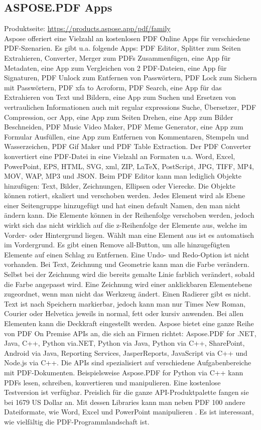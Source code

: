 \subsection{ASPOSE.PDF Apps}
Produktseite: \url{https://products.aspose.app/pdf/family} \\
Aspose offeriert eine Vielzahl an kostenlosen PDF Online Apps für verschiedene PDF-Szenarien. Es gibt u.a. folgende Apps: PDF Editor, Splitter zum Seiten Extrahieren, Converter, Merger zum PDFs Zusammenfügen, eine App für Metadaten, eine App zum Vergleichen von 2 PDF-Dateien, eine App für Signaturen, PDF Unlock zum Entfernen von Passwörtern, PDF Lock zum Sichern mit Passwörtern, PDF \gls{xfa} to Acroform, PDF Search, eine App für das Extrahieren von Text und Bildern, eine App zum Suchen und Ersetzen von vertraulichen Informationen auch mit regular expressions Suche, Übersetzer, PDF Compression, \gls{ocr} App, eine App zum Seiten Drehen, eine App zum Bilder Beschneiden, PDF Music Video Maker, PDF Meme Generator, eine App zum Formular Ausfüllen, eine App zum Entfernen von Kommentaren, Stempeln und Wasserzeichen, PDF Gif Maker und PDF Table Extraction. Der PDF Converter konvertiert eine PDF-Datei in eine Vielzahl an Formaten u.a. Word, Excel, PowerPoint, EPS, HTML, SVG, \gls{xml}, ZIP, LaTeX, PostScript, JPG, TIFF, MP4, MOV, WAP, MP3 und JSON. Beim PDF Editor kann man lediglich Objekte hinzufügen: Text, Bilder, Zeichnungen, Ellipsen oder Vierecke. Die Objekte können rotiert, skaliert und verschoben werden. Jedes Element wird als Ebene einer Seitengruppe hinzugefügt und hat einen default Namen, den man nicht ändern kann. Die Elemente können in der Reihenfolge verschoben werden, jedoch wirkt sich das nicht wirklich auf die z-Reihenfolge der Elemente aus, welche im Vorder- oder Hintergrund liegen. Wählt man eine Element aus ist es automatisch im Vordergrund. Es gibt einen Remove all-Button, um alle hinzugefügten Elemente auf einen Schlag zu Entfernen. Eine Undo- und Redo-Option ist nicht vorhanden. Bei Text, Zeichnung und Geometrie kann man die Farbe verändern. Selbst bei der Zeichnung wird die bereits gemalte Linie farblich verändert, sobald die Farbe angepasst wird. Eine Zeichnung wird einer anklickbaren Elementebene zugeordnet, wenn man nicht das Werkzeug ändert. Einen Radierer gibt es nicht. Text ist nach Speichern markierbar, jedoch kann man nur Times New Roman, Courier oder Helvetica jeweils in normal, fett oder kursiv anwenden. Bei allen Elementen kann die Deckkraft eingestellt werden. Aspose bietet eine ganze Reihe von PDF On Premise APIs an, die sich an Firmen richtet: Aspose.PDF for .NET, Java, C++, Python via.NET, Python via Java, Python via C++, SharePoint, Android via Java, Reporting Services, JasperReports, JavaScript via C++ und Node.js via C++. Die APIs sind spezialisiert auf verschiedene Aufgabenbereiche mit PDF-Dokumenten. Beispielsweise Aspose.PDF for Python via C++ kann PDFs lesen, schreiben, konvertieren und manipulieren. Eine kostenlose Testversion ist verfügbar. Preislich für die ganze API-Produktpalette fangen sie bei 1679 US Dollar an. Mit dessen Libraries kann man neben PDF 100 andere Dateiformate, wie Word, Excel und PowerPoint manipulieren \cite{aspose-api}. Es ist interessant, wie vielfältig die PDF-Programmlandschaft ist.

